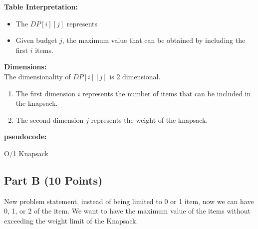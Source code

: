 \documentclass{article}[12pt]
\begin{document}
\noindent\textbf{Table Interpretation:} \\
\begin{itemize}
  \item The $DP[i][j]$ represents 
  \item Given budget $j$, the maximum value that can be obtained by including the first $i$ items.
\end{itemize}
\noindent\textbf{Dimensions:} \\
The dimensionality of $DP[i][j]$ is 2 dimensional.
\begin{enumerate}
  \item The first dimension $i$ represents the number of items that can be included in the knapsack.
  \item The second dimension $j$ represents the weight of the knapsack.
\end{enumerate}

\pagebreak
\noindent\textbf{pseudocode:} \\

\begin{algorithm}[H]
 \caption{O/1 Knapsack}

\end{algorithm}

\newpage
\subsection{Part B (10 Points)}
New problem statement, instead of being limited to 0 or 1 item, now we can have 0, 1, or 2 of the item.
We want to have the maximum value of the items without exceeding the weight limit of the Knapsack.\\
\end{document}
